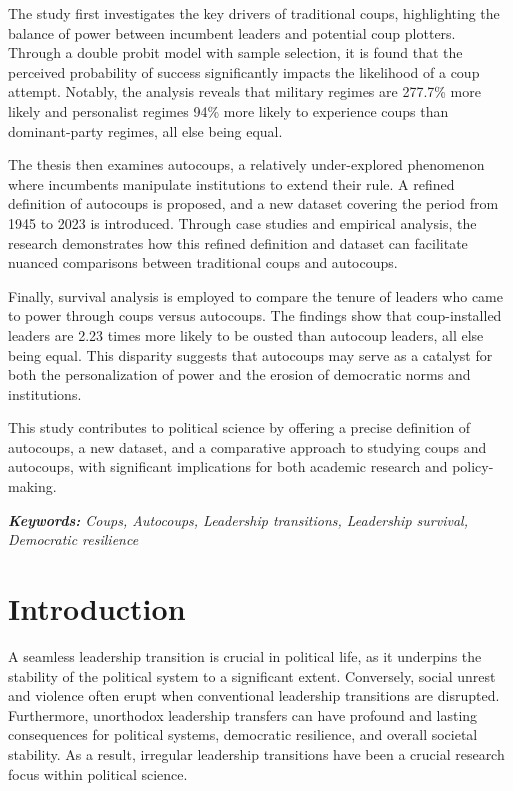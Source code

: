 \documentclass[
  12pt,
]{report}
\begin{document}
The study first investigates the key drivers of traditional coups,
highlighting the balance of power between incumbent leaders and
potential coup plotters. Through a double probit model with sample
selection, it is found that the perceived probability of success
significantly impacts the likelihood of a coup attempt. Notably, the
analysis reveals that military regimes are 277.7\% more likely and
personalist regimes 94\% more likely to experience coups than
dominant-party regimes, all else being equal.

The thesis then examines autocoups, a relatively under-explored
phenomenon where incumbents manipulate institutions to extend their
rule. A refined definition of autocoups is proposed, and a new dataset
covering the period from 1945 to 2023 is introduced. Through case
studies and empirical analysis, the research demonstrates how this
refined definition and dataset can facilitate nuanced comparisons
between traditional coups and autocoups.

Finally, survival analysis is employed to compare the tenure of leaders
who came to power through coups versus autocoups. The findings show that
coup-installed leaders are 2.23 times more likely to be ousted than
autocoup leaders, all else being equal. This disparity suggests that
autocoups may serve as a catalyst for both the personalization of power
and the erosion of democratic norms and institutions.

This study contributes to political science by offering a precise
definition of autocoups, a new dataset, and a comparative approach to
studying coups and autocoups, with significant implications for both
academic research and policy-making.

\emph{\textbf{Keywords:} Coups, Autocoups, Leadership transitions,
Leadership survival, Democratic resilience}

\chapter{Introduction}\label{introduction}

A seamless leadership transition is crucial in political life, as it
underpins the stability of the political system to a significant extent.
Conversely, social unrest and violence often erupt when conventional
leadership transitions are disrupted. Furthermore, unorthodox leadership
transfers can have profound and lasting consequences for political
systems, democratic resilience, and overall societal stability. As a
result, irregular leadership transitions have been a crucial research
focus within political science.
\end{document}
